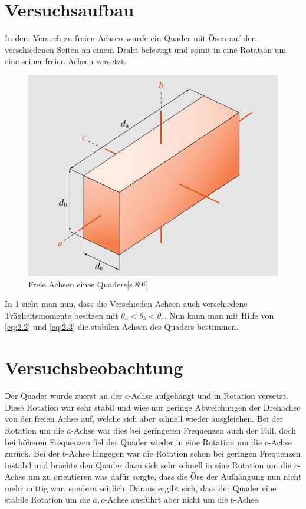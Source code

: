 \documentclass{include/protokollclass}
\begin{document}
    \section{Versuchsaufbau}
    In dem Versuch zu freien Achsen wurde ein  Quader mit Ösen auf den verschiedenen Seiten an einem Draht befestigt und somit in eine Rotation um eine seiner freien Achsen versetzt.
    \begin{figure}[h]
        \centering
        \includegraphics[scale=0.5]{fig/freieAchsen.pdf}
        \caption{Freie Achsen eines Quaders\cite{Meschede2015}[s.89f]}
        \label{fig:freieAchsen}
    \end{figure}
    In \ref{fig:freieAchsen} sieht man nun, dass die Verschieden Achsen auch verschiedene Trägheitsmomente besitzen mit $\theta_a <\theta_b<\theta_c$. Nun kann man mit Hilfe von \eqref{eq:2.2} und \eqref{eq:2.3} die stabilen Achsen des Quaders bestimmen.
    \section{Versuchsbeobachtung}
    Der Quader wurde zuerst an der $c$-Achse aufgehängt und in Rotation versetzt. Diese Rotation war sehr stabil und wies nur geringe Abweichungen der Drehachse von der freien Achse auf, welche sich aber schnell wieder ausgleichen. Bei der Rotation um die $a$-Achse war dies bei geringeren Frequenzen auch der Fall, doch bei höheren Frequenzen fiel der Quader wieder in eine Rotation um die $c$-Achse zurück. Bei der $b$-Achse hingegen war die Rotation schon bei geringen Frequenzen instabil und brachte den Quader dazu sich sehr schnell in eine Rotation um die $c$-Achse um zu orientieren was dafür sorgte, dass die Öse der Aufhängung nun nicht mehr mittig war, sondern seitlich.     
    Daraus ergibt sich, dass der Quader eine stabile Rotation um die $a,c$-Achse ausführt aber nicht um die $b$-Achse.
\end{document}
